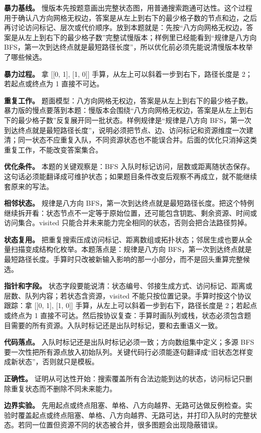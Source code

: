\textbf{暴力基线。} 慢版本先按题意画出完整状态图，用普通搜索跑通可达性。这个过程用于确认八方向网格无权边，答案是从左上到右下的最少格子数的节点和边，之后再讨论访问标记、层次或代价顺序。放到本题就是：先按“八方向网格无权边，答案是从左上到右下的最少格子数”完整试慢版本；样例里已经能看到“规律是八方向 BFS，第一次到达终点就是最短路径长度”，所以优化前必须先能说清慢版本枚举了哪些候选。

\textbf{暴力过程。} 拿 [[0, 1], [1, 0]] 手算，从左上可以斜着一步到右下，路径长度是 2；若起点或终点为 1 直接不可达。

\textbf{重复工作。} 题面模型：八方向网格无权边，答案是从左上到右下的最少格子数。暴力版的慢点要落到本题：慢版本会围绕“八方向网格无权边，答案是从左上到右下的最少格子数”反复展开同一批状态。样例规律是“规律是八方向 BFS，第一次到达终点就是最短路径长度”，说明必须把节点、边、访问标记和资源维度一次建清；同一状态不应重复入队，不同资源状态也不能误合并。后面的优化只消掉这类重复工作，不能改变答案集合。

\textbf{优化条件。} 本题的关键观察是：BFS 入队时标记访问，层数或距离随状态保存。这句话必须能翻译成可维护状态；如果题目条件改变后观察不再成立，就不能继续套原来的写法。

\textbf{相邻状态。} 规律是八方向 BFS，第一次到达终点就是最短路径长度。把这个特例继续拆开看：状态节点不一定等于原始位置，还可能包含钥匙、剩余资源、时间或访问集合。visited 只能合并未来能力完全相同的状态，否则会把合法路径剪掉。

\textbf{状态复用。} 把重复搜索压成访问标记、距离数组或拓扑状态；邻居生成也要从全量扫描变成结构化枚举。本题落点是：规律是八方向 BFS，第一次到达终点就是最短路径长度。手算时只改被新输入影响的那一小部分，而不是回头重算完整候选。

\textbf{指针和字段。} 状态字段要能说清：状态编号、邻接生成方式、访问标记、距离或层数、队列内容；若状态含资源，visited 不能只按位置记录。手算时按这个协议跟踪：拿 [[0, 1], [1, 0]] 手算，从左上可以斜着一步到右下，路径长度是 2；若起点或终点为 1 直接不可达。然后按协议复查：手算时画队列或栈，状态必须包含题目需要的所有资源。入队时标记还是出队时标记，要和去重语义一致。

\textbf{代码落点。} 入队时标记还是出队时标记必须一致；方向数组集中定义；多源 BFS 要一次性把所有源点放入初始队列。关键代码行必须能逐句翻译成“旧状态怎样变成新状态”，否则就只是模板。

\textbf{正确性。} 证明从可达性开始：搜索覆盖所有合法边能到达的状态，访问标记只删除重复状态而不删除不同未来能力。

\textbf{边界实验。} 先用起点或终点阻塞、单格、八方向越界、无路可达做反例检查。实验时覆盖起点或终点阻塞、单格、八方向越界、无路可达，并打印入队时的完整状态。若同一位置但资源不同的状态被合并，很多图题会出现隐蔽错误。

